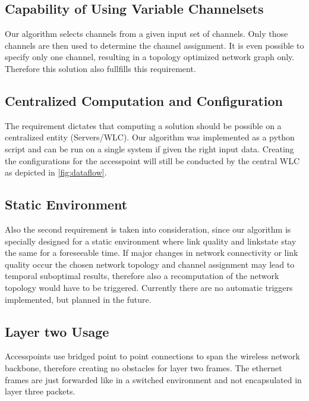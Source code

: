   \subsection{Capability of Using Variable Channelsets}
    Our algorithm selects channels from a given input set of channels. Only those channels are then used to determine the channel assignment.
    It is even possible to specify only one channel, resulting in a topology optimized network graph only.
    Therefore this solution also fullfills this requirement.
    
  \subsection{Centralized Computation and Configuration}
    The requirement dictates that computing a solution should be possible on a centralized entity (Servers/WLC).
    Our algorithm was implemented as a python script and can be run on a single system if given the right input data.
    Creating the configurations for the accesspoint will still be conducted by the central WLC as depicted in \ref{fig:dataflow}.
    
  \subsection{Static Environment} 
    Also the second requirement is taken into consideration, since our algorithm is specially designed for a static environment where link quality 
    and linkstate stay the same for a foreseeable time.
    If major changes in network connectivity or link quality occur the chosen network topology and channel assignment
    may lead to temporal suboptimal results, therefore also a recomputation of the network topology would have to be triggered.
    Currently there are no automatic triggers implemented, but planned in the future.
    
  \subsection{Layer two Usage}
    Accesspoints use bridged point to point connections to span the wireless network backbone, therefore creating no obstacles for layer two frames.
    The ethernet frames are just forwarded like in a switched environment and not encapsulated in layer three packets.
    
